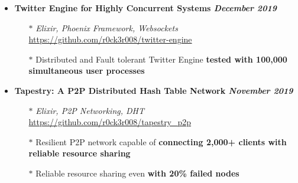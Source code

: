 \documentclass[10pt,a4paper]{article}
\begin{document}
\begin{itemize}[noitemsep,nolistsep]
		\item\textbf{Twitter Engine for Highly Concurrent Systems \hfill \textit{December 2019}}
			\begin{itemize}[leftmargin=*]
				\setlength\itemsep{-0.25em}
				\item[$\ast$]\textit{Elixir, Phoenix Framework, Websockets} \hfill \href{https://github.com/r0ck3r008/twitter-engine}{{\scriptsize https://github.com/r0ck3r008/twitter-engine}}
				\item[$\ast$]Distributed and Fault tolerant Twitter Engine \textbf{tested with 100,000 simultaneous user processes}
			\end{itemize}

		\item\textbf{Tapestry: A P2P Distributed Hash Table Network \hfill \textit{November 2019}}
			\begin{itemize}[leftmargin=*]
				\setlength\itemsep{-0.25em}
				\item[$\ast$]\textit{Elixir, P2P Networking, DHT} \hfill \href{https://github.com/r0ck3r008/tapestry\_p2p}{{\scriptsize https://github.com/r0ck3r008/tapestry\_p2p}}
				\item[$\ast$]Resilient P2P network capable of \textbf{connecting 2,000+ clients with reliable resource sharing}
				\item[$\ast$]Reliable resource sharing even \textbf{with 20\% failed nodes}
			\end{itemize}

	\end{itemize}
\end{document}
